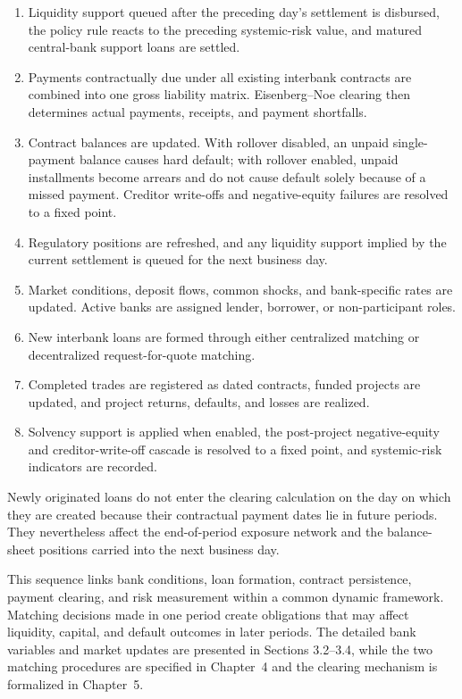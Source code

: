 \begin{enumerate}
\def\labelenumi{\arabic{enumi}.}
\item
  Liquidity support queued after the preceding day's settlement is
  disbursed, the policy rule reacts to the preceding systemic-risk value,
  and matured central-bank support loans are settled.
\item
  Payments contractually due under all existing interbank contracts are
  combined into one gross liability matrix. Eisenberg--Noe clearing then
  determines actual payments, receipts, and payment shortfalls.
\item
  Contract balances are updated. With rollover disabled, an unpaid
  single-payment balance causes hard default; with rollover enabled,
  unpaid installments become arrears and do not cause default solely
  because of a missed payment. Creditor write-offs and negative-equity
  failures are resolved to a fixed point.
\item
  Regulatory positions are refreshed, and any liquidity support implied
  by the current settlement is queued for the next business day.
\item
  Market conditions, deposit flows, common shocks, and bank-specific rates
  are updated. Active banks are assigned lender, borrower, or
  non-participant roles.
\item
  New interbank loans are formed through either centralized matching or
  decentralized request-for-quote matching.
\item
  Completed trades are registered as dated contracts, funded projects are
  updated, and project returns, defaults, and losses are realized.
\item
  Solvency support is applied when enabled, the post-project
  negative-equity and creditor-write-off cascade is resolved to a fixed
  point, and systemic-risk indicators are recorded.
\end{enumerate}

Newly originated loans do not enter the clearing calculation on the day
on which they are created because their contractual payment dates lie in
future periods. They nevertheless affect the end-of-period exposure
network and the balance-sheet positions carried into the next business
day.

This sequence links bank conditions, loan formation, contract
persistence, payment clearing, and risk measurement within a common
dynamic framework. Matching decisions made in one period create
obligations that may affect liquidity, capital, and default outcomes in
later periods. The detailed bank variables and market updates are
presented in Sections 3.2--3.4, while the two matching procedures are
specified in Chapter~4 and the clearing mechanism is formalized in
Chapter~5.

